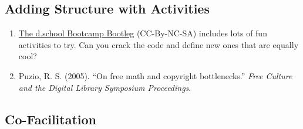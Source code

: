\hypertarget{adding-structure-with-activities}{%
\subsection{Adding Structure with
Activities}\label{adding-structure-with-activities}}

\begin{enumerate}
\def\labelenumi{\arabic{enumi}.}
\item
  \href{http://dschool.stanford.edu/wp-content/uploads/2011/03/BootcampBootleg2010v2SLIM.pdf}{The
  d.school Bootcamp Bootleg} (CC-By-NC-SA) includes lots of fun
  activities to try. Can you crack the code and define new ones that are
  equally cool?
\item
  Puzio, R. S. (2005). ``On free math and copyright bottlenecks.''
  \emph{Free Culture and the Digital Library Symposium Proceedings}.
\end{enumerate}

\hypertarget{co-facilitation}{%
\subsection{Co-Facilitation}\label{co-facilitation}}

